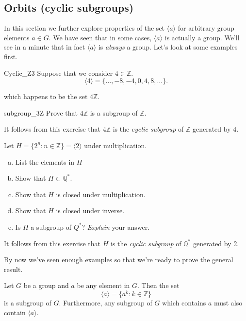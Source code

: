 \subsection{Orbits (cyclic subgroups)}\label{CyclicSubgroups}
In this section we further explore properties of the set $\langle a \rangle$ for arbitrary group elements $a \in G$. We have seen that in some cases, $\langle a \rangle$ is actually  a group. We'll see in a minute that in fact $\langle a \rangle$ is \emph{always} a group. Let's look at some examples first.

\begin{example}{Cyclic_Z3}
Suppose that we consider $4 \in {\mathbb Z}$. 
\[
\langle 4 \rangle = \{ \ldots,-8, -4, 0, 4, 8, \ldots \}.
\]

\noindent
which happens to be the set $4 {\mathbb Z}$.

\begin{exercise}{subgroup_3Z}
Prove that $4 {\mathbb Z}$ is a subgroup of $\mathbb Z$.
\end{exercise}
It follows from this exercise that $4 {\mathbb Z}$ is the \emph{cyclic subgroup} of $\mathbb Z$ generated by $4$.
\end{example}


\begin{exercise}{87}
Let $H = \{ 2^n : n \in {\mathbb Z} \} = \langle 2 \rangle$ under multiplication.
\begin{enumerate}[(a)]
\item
List the elements in $H$
\item
Show that $H \subset {\mathbb Q}^*$.
\item
Show that $H$ is closed under multiplication.
\item
Show that $H$ is closed under inverse.
\item
Is $H$ a subgroup of $Q^*$? \emph{Explain} your answer.
\end{enumerate}
\end{exercise}
It follows from this exercise that   $H$ is the \emph{cyclic subgroup} of ${\mathbb Q}^*$ generated by 2.   

By now we've seen enough examples so that we're ready to prove the general result.

\begin{thmprop}\label{OrbitIsSubgroup}
Let $G$ be a group and $a$ be any element in $G$.  Then the set
\[
\langle a \rangle  = \{ a^k : k \in {\mathbb Z} \}\label{generatedby}
\]
is a subgroup of $G$.  Furthermore, any subgroup of $G$ which contains $a$ must also contain $\langle a \rangle$. 
\end{thmprop}
 
